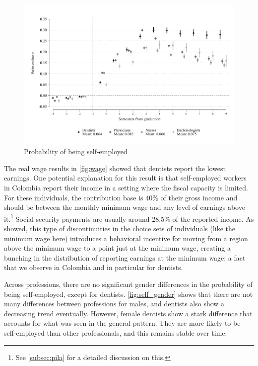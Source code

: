 \documentclass[12pt, a4paper]{article}
\begin{document}
\begin{figure}[H]
\caption{Probability of being self-employed}\label{fig:self}
\centering 
\includegraphics[width=\textwidth]{Figures/Callaway SantAnna/ES_pila_independientes_all.pdf}
\end{figure}

The real wage results in \autoref{fig:wage} showed that dentists report the lowest earnings. One potential explanation for this result is that self-employed workers in Colombia report their income in a setting where the fiscal capacity is limited. For these individuals, the contribution base is 40\% of their gross income and should be between the monthly minimum wage and any level of earnings above it.\footnote{See \autoref{subsec:pila} for a detailed discussion on this.} Social security payments are usually around 28.5\% of the reported income. As \citet{kleven2013using} showed, this type of discontinuities in the choice sets of individuals (like the minimum wage here) introduces a behavioral incentive for moving from a region above the minimum wage to a point just at the minimum wage, creating a bunching in the distribution of reporting earnings at the minimum wage; a fact that we observe in Colombia and in particular for dentists.

Across professions, there are no significant gender differences in the probability of being self-employed, except for dentists. \autoref{fig:self_gender} shows that there are not many differences between professions for males, and dentists also show a decreasing trend eventually. However, female dentists show a stark difference that accounts for what was seen in the general pattern. They are more likely to be self-employed than other professionals, and this remains stable over time.
\end{document}
